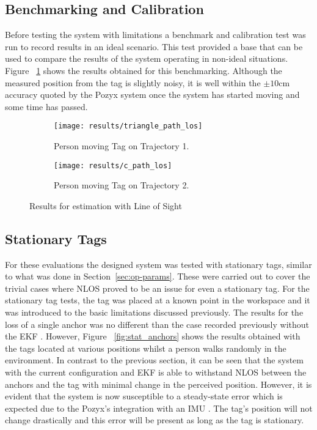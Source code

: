 \subsection{Benchmarking and Calibration}\label{sec:benchmarking}
Before testing the system with limitations a benchmark and calibration test was run to record results in an ideal scenario.
This test provided a base that can be used to compare the results of the system operating in non-ideal situations.
Figure ~\ref{fig:los} shows the results obtained for this benchmarking.
Although the measured position from the tag is slightly noisy, it is well within the $\pm10$cm accuracy quoted by the Pozyx system once the system has started moving and some time has passed.
\begin{figure}[h!]
    \centering
    \begin{subfigure}{0.6\textwidth}
            \texttt{[image: results/triangle\_path\_los]}
            \caption{Person moving Tag on Trajectory 1.}
    \end{subfigure}
    \begin{subfigure}{0.6\textwidth}
            \texttt{[image: results/c\_path\_los]}
            \caption{Person moving Tag on Trajectory 2.}
    \end{subfigure}
    \caption{Results for estimation with Line of Sight}
    \label{fig:los}
\end{figure}

\subsection{Stationary Tags}\label{sec:stationary-tags2}
For these evaluations the designed system was tested with stationary tags, similar to what was done in Section~\ref{sec:op-params}.
These were carried out to cover the trivial cases where NLOS proved to be an issue for even a stationary tag.
For the stationary tag tests, the tag was placed at a known point in the workspace and it was introduced to the basic limitations discussed previously.
The results for the loss of a single anchor was no different than the case recorded previously without the EKF .
However, Figure ~\ref{fig:stat_anchors} shows the results obtained with the tags located at various positions whilst a person walks randomly in the environment.
In contrast to the previous section, it can be seen that the system with the current configuration and EKF is able to withstand NLOS between the anchors and the tag with minimal change in the perceived position.
However, it is evident that the system is now susceptible to a steady-state error which is expected due to the Pozyx's integration with an IMU .
The tag's position will not change drastically and this error will be present as long as the tag is stationary.


